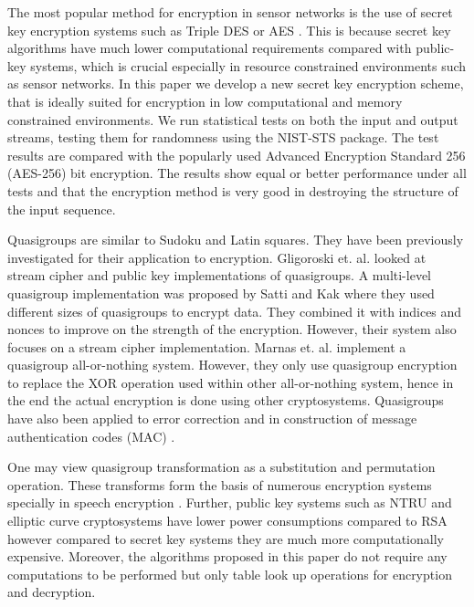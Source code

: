 \documentclass[conference]{IEEEtran}
\begin{document}
The most popular method for encryption in sensor networks is the use of secret key encryption systems such as Triple DES or AES \cite{parakh1, parakh2}. This is because secret key algorithms have much lower computational requirements compared with public-key systems, which is crucial especially in resource constrained environments such as sensor networks. In this paper we develop a new secret key encryption scheme, that is ideally suited for encryption in low computational and memory constrained environments. We run statistical tests on both the input and output streams, testing them for randomness using the NIST-STS package. The test results are compared with the popularly used Advanced Encryption Standard 256 (AES-256) bit encryption. The results show equal or better performance under all tests and that the encryption method is very good in destroying the structure of the input sequence.

Quasigroups are similar to Sudoku and Latin squares. They have been previously investigated for their application to encryption. Gligoroski et. al. \cite{Gligoroski1, Gligoroski2, Gligoroski3} looked at stream cipher and public key implementations of quasigroups. A multi-level quasigroup implementation was proposed by Satti and Kak \cite{Satti} where they used different sizes of quasigroups to encrypt data. They combined it with indices and nonces to improve on the strength of the encryption. However, their system also focuses on a stream cipher implementation. Marnas et. al. \cite{MarnasBlockQG} implement a quasigroup all-or-nothing system. However, they only use quasigroup encryption to replace the XOR operation used within other all-or-nothing system, hence in the end the actual encryption is done using other cryptosystems. Quasigroups have also been applied to error correction \cite{GligoroskiError} and in construction of message authentication codes (MAC) \cite{BakhtiariMAC}.

One may view quasigroup transformation as a substitution and permutation operation. These transforms form the basis of numerous encryption systems specially in speech encryption \cite{permutation1, permutation2}. Further, public key systems such as NTRU \cite{NTRU} and elliptic curve cryptosystems \cite{ECC} have lower power consumptions compared to RSA however compared to secret key systems they are much more computationally expensive. Moreover, the algorithms proposed in this paper do not require any computations to be performed but only table look up operations for encryption and decryption.
\end{document}
